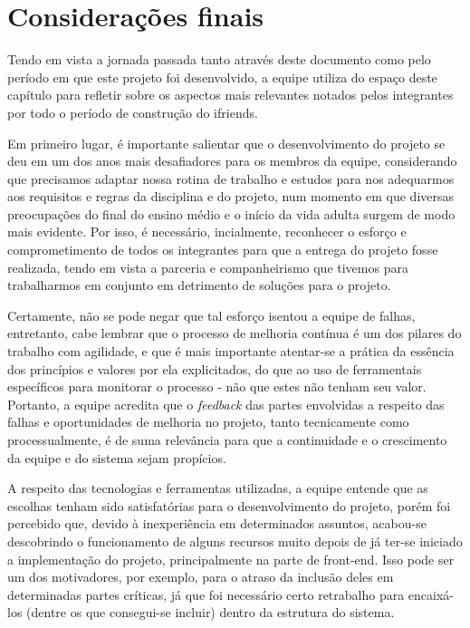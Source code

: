 
\chapter{Considerações finais}
Tendo em vista a jornada passada tanto através deste documento como pelo período em que este projeto foi desenvolvido, a equipe utiliza do espaço deste capítulo para
refletir sobre os aspectos mais relevantes notados pelos integrantes por todo o período de
construção do \gls{ifriends}.

Em primeiro lugar, é importante salientar que o desenvolvimento do projeto se deu em um dos anos mais desafiadores para os membros da equipe, considerando que precisamos adaptar nossa rotina de trabalho e estudos para nos adequarmos aos requisitos e regras da disciplina e do projeto, num momento em que diversas preocupações do final do ensino médio e o início da vida adulta surgem de modo mais evidente. Por isso, é necessário, incialmente, reconhecer o esforço e comprometimento de todos os integrantes para que a entrega do projeto fosse realizada, tendo em vista a parceria e companheirismo que tivemos para trabalharmos em conjunto em detrimento de soluções para o projeto.

Certamente, não se pode negar que tal esforço isentou a equipe de falhas, entretanto, cabe lembrar que o processo de melhoria contínua é um dos pilares do trabalho com agilidade, e que é mais importante atentar-se a prática da essência dos princípios e valores por ela explicitados, do que ao uso de ferramentais específicos para monitorar o processo - não que estes não tenham seu valor. Portanto, a equipe acredita que o \textsl{feedback} das partes envolvidas a respeito das falhas e oportunidades de melhoria no projeto, tanto tecnicamente como processualmente, é de suma relevância para que a continuidade e o crescimento da equipe e do sistema sejam propícios.

A respeito das tecnologias e ferramentas utilizadas, a equipe entende que as escolhas tenham sido satisfatórias para o desenvolvimento do projeto, porém foi percebido que, devido à inexperiência em determinados assuntos, acabou-se descobrindo o funcionamento de alguns recursos muito depois de já ter-se iniciado a implementação do projeto, principalmente na parte de \gls{front-end}. Isso pode ser um dos motivadores, por exemplo, para o atraso da inclusão deles em determinadas partes críticas, já que foi necessário certo retrabalho para encaixá-los (dentre os que consegui-se incluir) dentro da estrutura do sistema.

